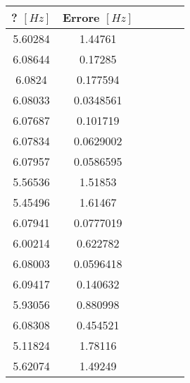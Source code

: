 \begin{tabular}{cccccc}
\toprule
? $[Hz]$ & Errore $[Hz]$ \\ \midrule
5.60284 & 1.44761\\ \midrule
6.08644 & 0.17285\\ \midrule
6.0824 & 0.177594\\ \midrule
6.08033 & 0.0348561\\ \midrule
6.07687 & 0.101719\\ \midrule
6.07834 & 0.0629002\\ \midrule
6.07957 & 0.0586595\\ \midrule
5.56536 & 1.51853\\ \midrule
5.45496 & 1.61467\\ \midrule
6.07941 & 0.0777019\\ \midrule
6.00214 & 0.622782\\ \midrule
6.08003 & 0.0596418\\ \midrule
6.09417 & 0.140632\\ \midrule
5.93056 & 0.880998\\ \midrule
6.08308 & 0.454521\\ \midrule
5.11824 & 1.78116\\ \midrule
5.62074 & 1.49249\\ \bottomrule
\end{tabular}
